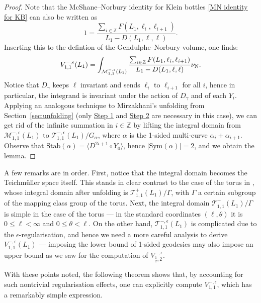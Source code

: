 \documentclass[12pt]{amsart}
\theoremstyle{plain}
\theoremstyle{definition}
\theoremstyle{remark}
\numberwithin{equation}{section}
\begin{document}
\begin{proof}
Note that the McShane--Norbury identity for Klein bottles \eqref{MN identity for KB} can also be written as
\begin{equation}
  1=  \frac{\sum_{i\in\mathbb{Z}}F(L_1,\ell_i,\ell_{i+1})}{L_1-D(L_1,\ell,\ell)}.\label{MN identity for KB2}
\end{equation}
Inserting this to the defintion of the Gendulphe--Norbury volume, one finds:
\begin{equation*}
V_{1,1}^{-,\epsilon}(L_1)=\int_{\mathcal{M}_{1,1}^{-,\epsilon}(L_1)}\frac{\sum_{i\in\mathbb{Z}}F(L_1,\ell_i,\ell_{i+1})}{L_1-D(L_1,\ell,\ell)}\nu_{{\rm N}}.
\end{equation*}
Notice that $D_\gamma$ keeps $\ell$ invariant and sends $\ell_i$ to $\ell_{i+1}$ for all $i$, hence in particular, the integrand is invariant under the action of $D_\gamma$ and of each $Y_i$. Applying an analogous technique to Mirzakhani's unfolding from Section~\ref{sec:unfolding} (only \hyperref[item:Step1]{Step 1} and \hyperref[item:Step2]{Step 2} are necessary in this case), we can get rid of the infinite summation in $i\in\mathbb{Z}$ by lifting the integral domain from $\mathcal{M}_{1,1}^{-,\epsilon}(L_1)$ to $\mathcal{T}_{1,1}^{-,\epsilon}(L_1)/G_{\alpha}$, where $\alpha$ is the 1-sided multi-curve $\alpha_i+\alpha_{i+1}$. Observe that $\mathrm{Stab}(\alpha)=\langle D^{2i+1}\circ Y_0\rangle$, hence $|\mathrm{Sym}(\alpha)|=2$, and we obtain the lemma. 
\end{proof}

A few remarks are in order. First, notice that the integral domain becomes the Teichm\"{u}ller space itself. This stands in clear contrast to the case of the torus in \cite{Mir06}, whose integral domain after unfolding is $\mathcal{T}_{1,1}^+(L_1)/\Gamma$, with $\Gamma$ a certain subgroup of the mapping class group of the torus. Next, the integral domain $\mathcal{T}_{1,1}^+(L_1)/\Gamma$ is simple in the case of the torus --- in the standard coordinates $(\ell,\theta)$ it is $0\leq\ell<\infty$ and $0\leq\theta<\ell$. On the other hand, $\mathcal{T}_{1,1}^{-,\epsilon}(L_1)$ is complicated due to the $\epsilon$-regularisation, and hence we need a more careful analysis to derive $V_{1,1}^{-,\epsilon}(L_1)$ --- imposing the lower bound of 1-sided geodesics may also impose an upper bound as we saw for the computation of $V_{\frac12,2}^{-,\epsilon}$.

With these points noted, the following theorem shows that, by accounting for such nontrivial regularisation effects, one can explicitly compute $V_{1,1}^{-,\epsilon}$, which has a remarkably simple expression.
\end{document}
